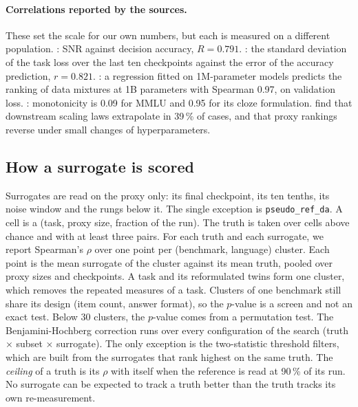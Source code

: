 \paragraph{Correlations reported by the sources.}
These set the scale for our own numbers, but each is measured on a different population.
\citet{heineman_signal_2025}: SNR against decision accuracy, $R = 0.791$.
\citet{bhagia_establishing_2025}: the standard deviation of the task loss over the last ten checkpoints against the error of the accuracy prediction, $r = 0.821$.
\citet{liu_regmix_2025}: a regression fitted on 1M-parameter models predicts the ranking of data mixtures at 1B parameters with Spearman 0.97, on validation loss.
\citet{madaan_quantifying_2024}: monotonicity is 0.09 for MMLU and 0.95 for its cloze formulation.
\citet{lourie_scaling_2025} find that downstream scaling laws extrapolate in 39\,\% of cases, and \citet{wang_can_2026} that proxy rankings reverse under small changes of hyperparameters.

\subsection{How a surrogate is scored}
\label{app:sur-scoring}

Surrogates are read on the proxy only: its final checkpoint, its ten tenths, its noise window and the rungs below it.
The single exception is \texttt{pseudo\_ref\_da}.
A cell is a (task, proxy size, fraction of the run). The truth is taken over cells above chance and with at least three pairs.
For each truth and each surrogate, we report Spearman's $\rho$ over one point per (benchmark, language) cluster. Each point is the mean surrogate of the cluster against its mean truth, pooled over proxy sizes and checkpoints.
A task and its reformulated twins form one cluster, which removes the repeated measures of a task. Clusters of one benchmark still share its design (item count, answer format), so the $p$-value is a screen and not an exact test. Below 30 clusters, the $p$-value comes from a permutation test.
The Benjamini-Hochberg correction runs over every configuration of the search (truth $\times$ subset $\times$ surrogate). The only exception is the two-statistic threshold filters, which are built from the surrogates that rank highest on the same truth.
The \emph{ceiling} of a truth is its $\rho$ with itself when the reference is read at 90\,\% of its run. No surrogate can be expected to track a truth better than the truth tracks its own re-measurement.

